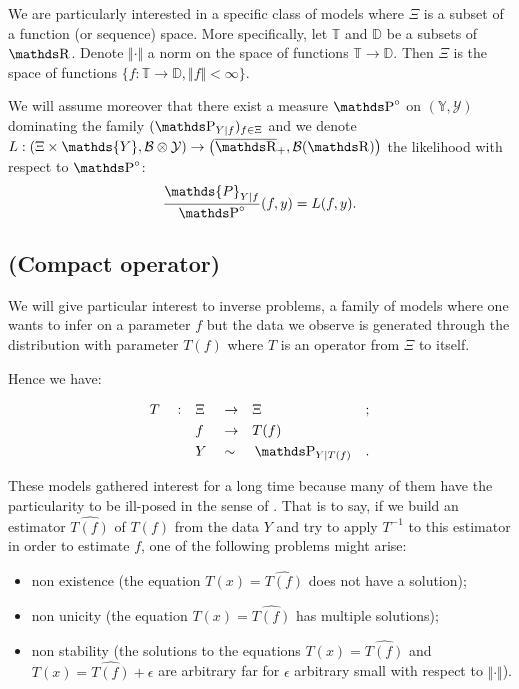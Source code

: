 \bigskip

We are particularly interested in a specific class of models where $\Xi$ is a subset of a function (or sequence) space.
More specifically, let $\mathds{T}$ and $\mathds{D}$ be a subsets of $\R$.
Denote $\Vert \cdot \Vert$ a norm on the space of functions $\mathds{T} \rightarrow \mathds{D}$.
Then $\Xi$ is the space of functions $\{f : \mathds{T} \rightarrow \mathds{D}, \Vert f \Vert < \infty\}$.

\bigskip

We will assume moreover that there exist a measure $\P^{\circ}$ on $(\mathds{Y}, \mathcal{Y})$ dominating the family $(\P_{Y \vert f})_{f \in \Xi}$ and we denote $L : \left(\Xi \times \mathds{Y}, \mathcal{B} \otimes \mathcal{Y}\right) \rightarrow \left(\overline{\R}_{+}, \mathcal{B}(\R)\right)$ the likelihood with respect to $\P^{\circ}$:
\[\frac{\mathds{P}_{Y \vert f}}{\P^{\circ}}(f, y) = L(f, y).\]

\subsection{(Compact operator)}\label{1.1.2}
We will give particular interest to inverse problems, a family of models where one wants to infer on a parameter $f$ but the data we observe is generated through the distribution with parameter $T(f)$ where $T$ is an operator from $\Xi$ to itself.

Hence we have:

\begin{alignat*}{6}
& T && : && \Xi && \rightarrow && \Xi && ; \\
& && && f && \rightarrow && T(f) && \\
& && && Y && \sim && \P_{Y \vert T(f)} &&.
\end{alignat*}

These models gathered interest for a long time because many of them have the particularity to be ill-posed in the sense of \citet{cite:hadamard}.
That is to say, if we build an estimator $\widehat{T(f)}$ of $T(f)$ from the data $Y$ and try to apply $T^{-1}$ to this estimator in order to estimate $f$, one of the following problems might arise:
\begin{itemize}
\item non existence (the equation $T(x) = \widehat{T(f)}$ does not have a solution);
\item non unicity (the equation $T(x) = \widehat{T(f)}$ has multiple solutions);
\item non stability (the solutions to the equations $T(x) = \widehat{T(f)}$ and $T(x) = \widehat{T(f)} + \epsilon$ are arbitrary far for $\epsilon$ arbitrary small with respect to $\Vert \cdot \Vert$).
\end{itemize}


